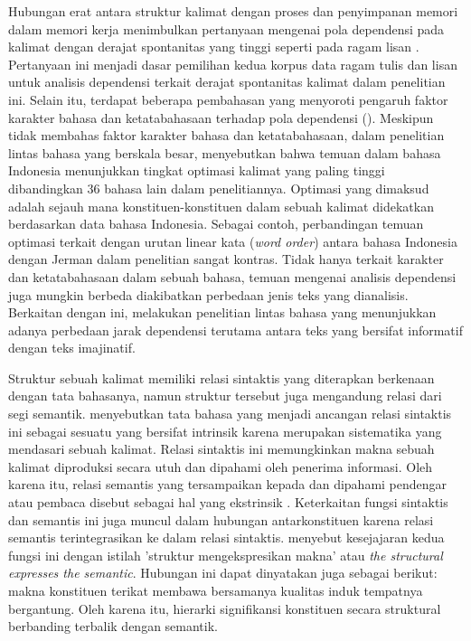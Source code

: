 Hubungan erat antara struktur kalimat dengan proses dan penyimpanan memori dalam memori kerja menimbulkan pertanyaan mengenai pola dependensi pada kalimat dengan derajat spontanitas yang tinggi seperti pada ragam lisan \citep{abney1991memory}. Pertanyaan ini menjadi dasar  pemilihan kedua korpus data ragam tulis dan lisan untuk analisis dependensi terkait derajat spontanitas kalimat dalam penelitian ini. Selain itu, terdapat beberapa pembahasan yang menyoroti pengaruh faktor karakter bahasa dan ketatabahasaan terhadap pola dependensi (\citealp{hawkins2014cross, jiang2015effects, wang2017effects}). Meskipun tidak membahas faktor karakter bahasa dan ketatabahasaan, dalam penelitian lintas bahasa yang berskala besar, \cite{futrell2015large} menyebutkan bahwa temuan dalam bahasa Indonesia menunjukkan tingkat optimasi kalimat yang paling tinggi dibandingkan 36 bahasa lain dalam penelitiannya. Optimasi yang dimaksud adalah sejauh mana konstituen-konstituen dalam sebuah kalimat didekatkan berdasarkan data bahasa Indonesia. Sebagai contoh, perbandingan temuan optimasi terkait dengan urutan linear kata (\textit{word order}) antara bahasa Indonesia dengan Jerman dalam penelitian \cite{futrell2015large} sangat kontras. Tidak hanya terkait karakter dan ketatabahasaan dalam sebuah bahasa, temuan mengenai analisis dependensi juga mungkin berbeda diakibatkan perbedaan jenis teks yang dianalisis. Berkaitan dengan ini, \cite{wang2017effects} melakukan penelitian lintas bahasa yang menunjukkan adanya perbedaan jarak dependensi terutama antara teks yang bersifat informatif dengan teks imajinatif.

Struktur sebuah kalimat memiliki relasi sintaktis yang diterapkan berkenaan dengan tata bahasanya, namun struktur tersebut juga mengandung relasi dari segi semantik. \cite{tesniere1959elements} menyebutkan tata bahasa yang menjadi ancangan relasi sintaktis ini sebagai sesuatu yang bersifat intrinsik karena merupakan sistematika yang mendasari sebuah kalimat. Relasi sintaktis ini memungkinkan makna sebuah kalimat diproduksi secara utuh dan dipahami oleh penerima informasi. Oleh karena itu, relasi semantis yang tersampaikan kepada dan dipahami pendengar atau pembaca disebut sebagai hal yang ekstrinsik \citep{tesniere1959elements}. Keterkaitan fungsi sintaktis dan semantis ini juga muncul dalam hubungan antarkonstituen karena relasi semantis terintegrasikan ke dalam relasi sintaktis. \cite{tesniere1959elements} menyebut kesejajaran kedua fungsi ini dengan istilah 'struktur mengekspresikan makna' atau \textit{the structural expresses the semantic}. Hubungan ini dapat dinyatakan juga sebagai berikut: makna konstituen terikat membawa bersamanya kualitas induk tempatnya bergantung. Oleh karena itu, hierarki signifikansi konstituen secara struktural berbanding terbalik dengan semantik.

